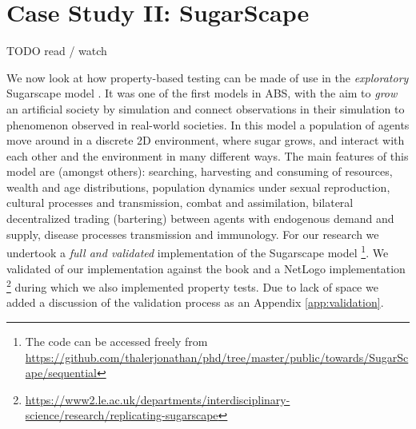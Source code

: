 \section{Case Study II: SugarScape}
\label{sec:case_sug}
TODO read / watch

We now look at how property-based testing can be made of use in the \textit{exploratory} Sugarscape model \cite{epstein_growing_1996}. It was one of the first models in ABS, with the aim to \textit{grow} an artificial society by simulation and connect observations in their simulation to phenomenon observed in real-world societies. In this model a population of agents move around in a discrete 2D environment, where sugar grows, and interact with each other and the environment in many different ways. The main features of this model are (amongst others): searching, harvesting and consuming of resources, wealth and age distributions, population dynamics under sexual reproduction, cultural processes and transmission, combat and assimilation, bilateral decentralized trading (bartering) between agents with endogenous demand and supply, disease processes transmission and immunology. For our research we undertook a \textit{full and validated} implementation of the Sugarscape model \footnote{The code can be accessed freely from \url{https://github.com/thalerjonathan/phd/tree/master/public/towards/SugarScape/sequential}}. We validated of our implementation against the book \cite{epstein_growing_1996} and a NetLogo implementation \cite{weaver_replicating_2009} \footnote{\url{https://www2.le.ac.uk/departments/interdisciplinary-science/research/replicating-sugarscape}} during which we also implemented property tests. Due to lack of space we added a discussion of the validation process as an Appendix \ref{app:validation}.

